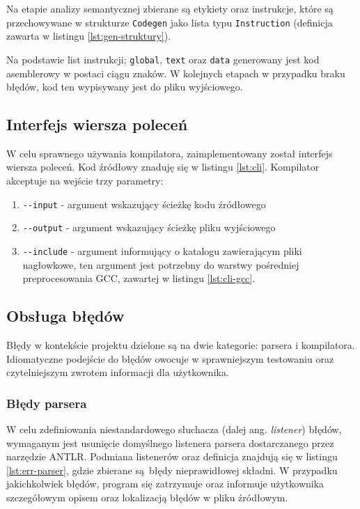 Na etapie analizy semantycznej zbierane są etykiety oraz instrukcje, które są przechowywane w strukturze \verb|Codegen| jako lista typu \verb|Instruction| (definicja zawarta w listingu \ref{lst:gen-struktury}).

Na podstawie list instrukcji; \verb|global|, \verb|text| oraz \verb|data| generowany jest kod asemblerowy w postaci ciągu znaków. W kolejnych etapach w przypadku braku błędów, kod ten wypisywany jest do pliku wyjściowego.

\subsection{Interfejs wiersza poleceń}

W celu sprawnego używania kompilatora, zaimplementowany został interfejs wiersza poleceń. Kod źródłowy znaduję się w listingu \ref{lst:cli}. Kompilator akceptuje na wejście trzy parametry:
\begin{enumerate}
    \item \verb|--input| - argument wskazujący ścieżkę kodu źródłowego
    \item \verb|--output| - argument wskazujący ścieżkę pliku wyjściowego
    \item \verb|--include| - argument informujący o katalogu zawierającym pliki nagłowkowe, ten argument jest potrzebny do warstwy pośredniej preprocesowania GCC, zawartej w listingu \ref{lst:cli-gcc}.
\end{enumerate}

\subsection{Obsługa błędów}

Błędy w kontekście projektu dzielone są na dwie kategorie: parsera i kompilatora. Idiomatyczne podejście do błędów owocuje w sprawniejszym testowaniu oraz czytelniejszym zwrotem informacji dla użytkownika.
\subsubsection{Błędy parsera}

W celu zdefiniowania niestandardowego słuchacza (dalej ang. \textit{listener}) błędów, wymaganym jest usunięcie domyślnego listenera parsera dostarczanego przez narzędzie ANTLR. Podmiana listenerów oraz definicja znajdują się w listingu \ref{lst:err-parser}, gdzie zbierane są błędy nieprawidłowej składni. W przypadku jakichkolwiek błędów, program się zatrzymuje oraz informuje użytkownika szczegółowym opisem oraz lokalizacją błędów w pliku źródłowym.

